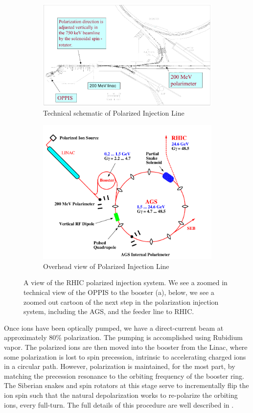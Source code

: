 \begin{figure}
  \centering
  \begin{subfigure}[b]{\textwidth}
    \centering
    \includegraphics[width=0.7\linewidth]{./figures/rhic_polarized_injector.png}
		\caption{
			Technical schematic of Polarized Injection Line \cite{Zelenski2007}
		}
    \label{fig:polarized_top_view_1} 
  \end{subfigure}
  \begin{subfigure}[b]{\textwidth}
    \centering
    \includegraphics[width=0.7\linewidth]{./figures/polarized_beam_rhic_complex.png}
		\caption{
			Overhead view of Polarized Injection Line \cite{RHIC2006}
		}
    \label{fig:polarized_top_view_2}
  \end{subfigure}
  \caption{
		A view of the RHIC polarized injection system. We see a zoomed in technical
		view of the OPPIS to the booster (a), below, we see a zoomed out cartoon of
		the next step in the polarization injection system, including the AGS, and
		the feeder line to RHIC.
  }
  \label{fig:rhic_polarized_beam_line}
\end{figure}

Once ions have been optically pumped, we have a direct-current beam at
approximately 80\% polarization. The pumping is accomplished using Rubidium
vapor. The polarized ions are then moved into the booster from the Linac, where
some polarization is lost to spin precession, intrinsic to accelerating charged
ions in a circular path. However, polarization is maintained, for the most part,
by matching the precession resonance to the orbiting frequency of the booster
ring. The Siberian snakes and spin rotators at this stage serve to incrementally
flip the ion spin such that the natural depolarization works to re-polarize the
orbiting ions, every full-turn. The full details of this procedure are well
described in \cite{RHIC2006}.

